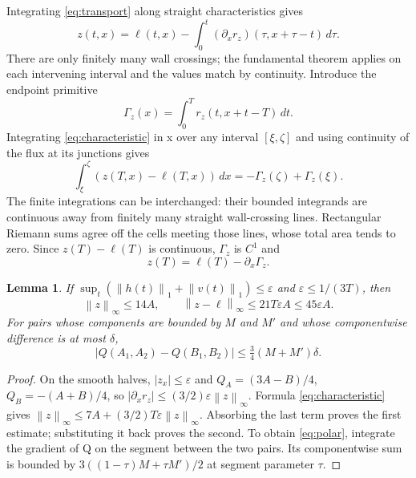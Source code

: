 \documentclass[11pt]{article}
\newtheorem{lemma}[theorem]{Lemma}
\newcommand{\norm}[1]{\left\|#1\right\|}
\begin{document}
Integrating \eqref{eq:transport} along straight characteristics gives
\begin{equation}\label{eq:characteristic}
z(t,x)=\ell(t,x)-\int_0^t(\partial_xr_z)(\tau,x+\tau-t)\,d\tau.
\end{equation}
There are only finitely many wall crossings; the fundamental theorem applies
on each intervening interval and the values match by continuity. Introduce
the endpoint primitive
\begin{equation}\label{eq:gamma}
\Gamma_z(x)=\int_0^T r_z(t,x+t-T)\,dt.
\end{equation}
Integrating \eqref{eq:characteristic} in x over any interval $[\xi,\zeta]$
and using continuity of the flux at its junctions gives
\[
\int_\xi^\zeta(z(T,x)-\ell(T,x))\,dx
=-\Gamma_z(\zeta)+\Gamma_z(\xi).
\]
The finite integrations can be interchanged: their bounded integrands are
continuous away from finitely many straight wall-crossing lines. Rectangular
Riemann sums agree off the cells meeting those lines, whose total area tends
to zero. Since $z(T)-\ell(T)$ is continuous, $\Gamma_z$ is $C^1$ and
\begin{equation}\label{eq:endpoint}
z(T)=\ell(T)-\partial_x\Gamma_z.
\end{equation}

\begin{lemma}\label{lem:nonlinear}
If $\sup_t(\norm{h(t)}_1+\norm{v(t)}_1)\le\varepsilon$ and
$\varepsilon\le1/(3T)$, then
\begin{equation}\label{eq:state-bound}
\norm{z}_\infty\le14A,\qquad
\norm{z-\ell}_\infty\le21T\varepsilon A\le45\varepsilon A.
\end{equation}
For pairs whose components are bounded by $M$ and $M'$ and whose
componentwise difference is at most $\delta$,
\begin{equation}\label{eq:polar}
|Q(A_1,A_2)-Q(B_1,B_2)|\le\tfrac34(M+M')\delta.
\end{equation}
\end{lemma}
\begin{proof}
On the smooth halves, $|z_x|\le\varepsilon$ and
$Q_A=(3A-B)/4$, $Q_B=-(A+B)/4$, so
$|\partial_xr_z|\le(3/2)\varepsilon\norm{z}_\infty$.
Formula \eqref{eq:characteristic} gives
$\norm{z}_\infty\le7A+(3/2)T\varepsilon\norm{z}_\infty$.
Absorbing the last term proves the first estimate; substituting it back
proves the second. To obtain \eqref{eq:polar}, integrate the gradient of Q
on the segment between the two pairs. Its componentwise sum is bounded by
$3((1-\tau)M+\tau M')/2$ at segment parameter $\tau$.
\end{proof}
\end{document}
